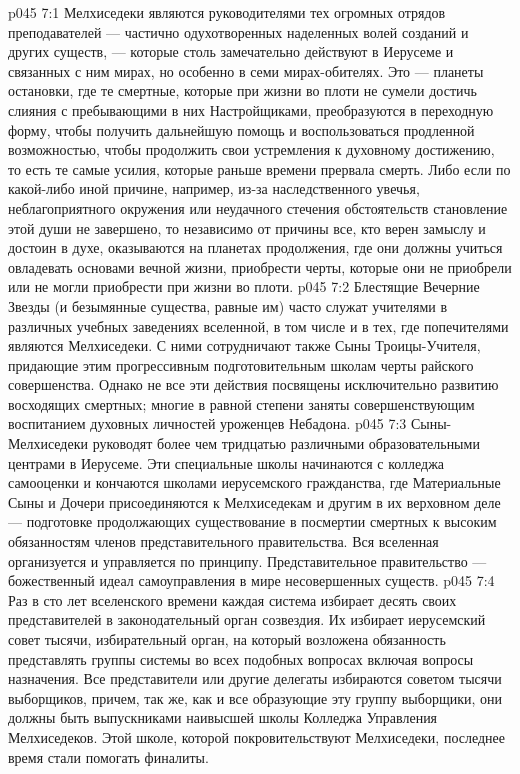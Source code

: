 \vs p045 7:1 Мелхиседеки являются руководителями тех огромных отрядов преподавателей --- частично одухотворенных наделенных волей созданий и других существ, --- которые столь замечательно действуют в Иерусеме и связанных с ним мирах, но особенно в семи мирах\hyp{}обителях. Это --- планеты остановки, где те смертные, которые при жизни во плоти не сумели достичь слияния с пребывающими в них Настройщиками, преобразуются в переходную форму, чтобы получить дальнейшую помощь и воспользоваться продленной возможностью, чтобы продолжить свои устремления к духовному достижению, то есть те самые усилия, которые раньше времени прервала смерть. Либо если по какой\hyp{}либо иной причине, например, из\hyp{}за наследственного увечья, неблагоприятного окружения или неудачного стечения обстоятельств становление этой души не завершено, то независимо от причины все, кто верен замыслу и достоин в духе, оказываются на планетах продолжения, где они должны учиться овладевать основами вечной жизни, приобрести черты, которые они не приобрели или не могли приобрести при жизни во плоти.
\vs p045 7:2 Блестящие Вечерние Звезды (и безымянные существа, равные им) часто служат учителями в различных учебных заведениях вселенной, в том числе и в тех, где попечителями являются Мелхиседеки. С ними сотрудничают также Сыны Троицы\hyp{}Учителя, придающие этим прогрессивным подготовительным школам черты райского совершенства. Однако не все эти действия посвящены исключительно развитию восходящих смертных; многие в равной степени заняты совершенствующим воспитанием духовных личностей уроженцев Небадона.
\vs p045 7:3 Сыны\hyp{}Мелхиседеки руководят более чем тридцатью различными образовательными центрами в Иерусеме. Эти специальные школы начинаются с колледжа самооценки и кончаются школами иерусемского гражданства, где Материальные Сыны и Дочери присоединяются к Мелхиседекам и другим в их верховном деле --- подготовке продолжающих существование в посмертии смертных к высоким обязанностям членов представительного правительства. Вся вселенная организуется и управляется по  принципу. Представительное правительство --- божественный идеал самоуправления в мире несовершенных существ.
\vs p045 7:4 Раз в сто лет вселенского времени каждая система избирает десять своих представителей в законодательный орган созвездия. Их избирает иерусемский совет тысячи, избирательный орган, на который возложена обязанность представлять группы системы во всех подобных вопросах включая вопросы назначения. Все представители или другие делегаты избираются советом тысячи выборщиков, причем, так же, как и все образующие эту группу выборщики, они должны быть выпускниками наивысшей школы Колледжа Управления Мелхиседеков. Этой школе, которой покровительствуют Мелхиседеки, последнее время стали помогать финалиты.
